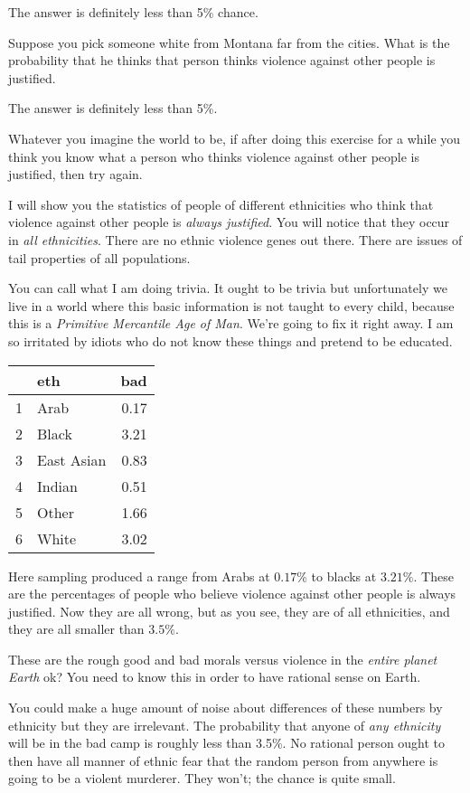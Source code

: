 \documentclass{amsart}
\begin{document}
The answer is definitely less than 5\% chance.  

Suppose you pick someone white from Montana far from the cities. What is the probability that he thinks that person thinks violence against other people is justified.  

The answer is definitely less than 5\%.

Whatever you imagine the world to be, if after doing this exercise for a while you think you know what a person who thinks violence against other people is justified, then try again.  

I will show you the statistics of people of different ethnicities who think that violence against other people is {\em always justified}.  You will notice that they occur in {\em all ethnicities}.  There are no ethnic violence genes out there.  There are issues of tail properties of all populations.  

You can call what I am doing trivia.  It ought to be trivia but unfortunately we live in a world where this basic information is not taught to every child, because this is a {\em Primitive Mercantile Age of Man}.  We're going to fix it right away.  I am so irritated by idiots who do not know these things and pretend to be educated.

\begin{table}[ht]
\centering
\begin{tabular}{rlr}
  \hline
 & eth & bad \\ 
  \hline
1 & Arab & 0.17 \\ 
  2 & Black & 3.21 \\ 
  3 & East Asian & 0.83 \\ 
  4 & Indian & 0.51 \\ 
  5 & Other & 1.66 \\ 
  6 & White & 3.02 \\ 
   \hline
\end{tabular}
\end{table}

Here sampling produced a range from Arabs at $0.17\%$ to blacks at $3.21\%$.  These are the percentages of people who believe violence against other people is always justified.  Now they are all wrong, but as you see, they are of all ethnicities, and they are all smaller than $3.5\%$.

These are the rough good and bad morals versus violence in the {\em entire planet Earth} ok?  You need to know this in order to have rational sense on Earth.

You could make a huge amount of noise about differences of these numbers by ethnicity but they are irrelevant.  The probability that anyone of {\em any ethnicity} will be in the bad camp is roughly less than 3.5\%.  No rational person ought to then have all manner of ethnic fear that the random person from anywhere is going to be a violent murderer.  They won't; the chance is quite small.
\end{document}
